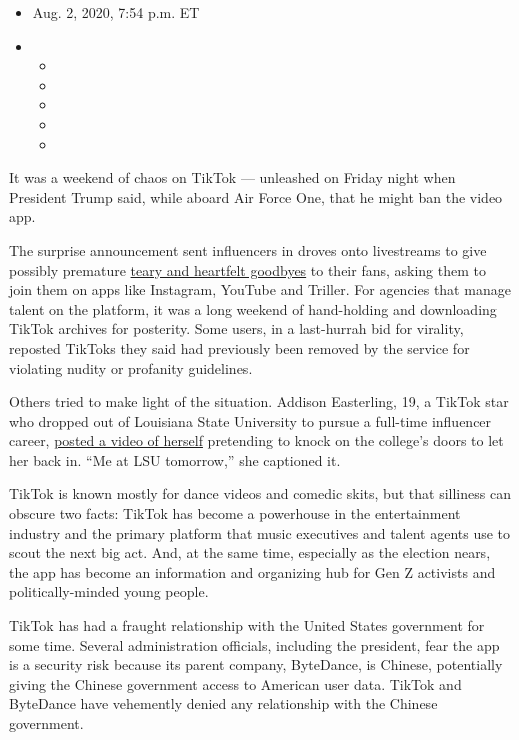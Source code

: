 \begin{itemize}
\item
  Aug. 2, 2020, 7:54 p.m. ET
\item
  \begin{itemize}
  \item
  \item
  \item
  \item
  \item
  \end{itemize}
\end{itemize}

It was a weekend of chaos on TikTok --- unleashed on Friday night when
President Trump said, while aboard Air Force One, that he might ban the
video app.

The surprise announcement sent influencers in droves onto livestreams to
give possibly premature
\href{https://twitter.com/iamaliceophelia/status/1289402462957273088}{teary
and heartfelt goodbyes} to their fans, asking them to join them on apps
like Instagram, YouTube and Triller. For agencies that manage talent on
the platform, it was a long weekend of hand-holding and downloading
TikTok archives for posterity. Some users, in a last-hurrah bid for
virality, reposted TikToks they said had previously been removed by the
service for violating nudity or profanity guidelines.

Others tried to make light of the situation. Addison Easterling, 19, a
TikTok star who dropped out of Louisiana State University to pursue a
full-time influencer career,
\href{https://vm.tiktok.com/J2T9X8K/}{posted a video of herself}
pretending to knock on the college's doors to let her back in. ``Me at
LSU tomorrow,'' she captioned it.

TikTok is known mostly for dance videos and comedic skits, but that
silliness can obscure two facts: TikTok has become a powerhouse in the
entertainment industry and the primary platform that music executives
and talent agents use to scout the next big act. And, at the same time,
especially as the election nears, the app has become an information and
organizing hub for Gen Z activists and politically-minded young people.

TikTok has had a fraught relationship with the United States government
for some time. Several administration officials, including the
president, fear the app is a security risk because its parent company,
ByteDance, is Chinese, potentially giving the Chinese government access
to American user data. TikTok and ByteDance have vehemently denied any
relationship with the Chinese government.

